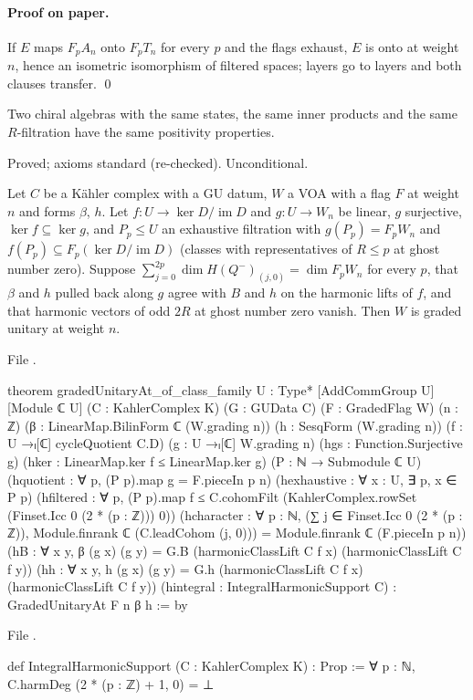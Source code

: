 \paragraph{Proof on paper.} If $E$ maps $F_pA_n$ onto $F_pT_n$ for every $p$ and the flags exhaust, $E$ is onto at weight $n$, hence an
isometric isomorphism of filtered spaces; layers go to layers and both clauses transfer. \qed

\begin{physics}
Two chiral algebras with the same states, the same inner products and the same $R$-filtration have the same positivity properties.
\end{physics}

\begin{status}
Proved; axioms standard (re-checked). Unconditional.
\end{status}

\begin{theorem}\label{l28:thm:classfamily}
Let $C$ be a Kähler complex with a GU datum, $W$ a VOA with a flag $F$ at weight $n$ and forms $\beta$, $h$. Let $f:U\to\ker D/\operatorname{im}D$
and $g:U\to W_n$ be linear, $g$ surjective, $\ker f\subseteq\ker g$, and $P_p\le U$ an exhaustive filtration with $g(P_p)=F_pW_n$ and
$f(P_p)\subseteq F_{p}(\ker D/\operatorname{im}D)$ (classes with representatives of $R\le p$ at ghost number zero). Suppose
$\sum_{j=0}^{2p}\dim H(Q^-)_{(j,0)}=\dim F_pW_n$ for every $p$, that $\beta$ and $h$ pulled back along $g$ agree with $B$ and $h$ on the harmonic
lifts of $f$, and that harmonic vectors of odd $2R$ at ghost number zero vanish. Then $W$ is graded unitary at weight $n$.
\end{theorem}

\noindent File .
\begin{leancode}
theorem gradedUnitaryAt_of_class_family {U : Type*} [AddCommGroup U] [Module ℂ U]
    (C : KahlerComplex K) (G : GUData C) (F : GradedFlag W) (n : ℤ)
    (β : LinearMap.BilinForm ℂ (W.grading n)) (h : SesqForm (W.grading n))
    (f : U →ₗ[ℂ] cycleQuotient C.D) (g : U →ₗ[ℂ] W.grading n)
    (hgs : Function.Surjective g) (hker : LinearMap.ker f ≤ LinearMap.ker g)
    (P : ℕ → Submodule ℂ U)
    (hquotient : ∀ p, (P p).map g = F.pieceIn p n)
    (hexhaustive : ∀ x : U, ∃ p, x ∈ P p)
    (hfiltered : ∀ p, (P p).map f ≤
      C.cohomFilt (KahlerComplex.rowSet (Finset.Icc 0 (2 * (p : ℤ))) 0))
    (hcharacter : ∀ p : ℕ,
      (∑ j ∈ Finset.Icc 0 (2 * (p : ℤ)), Module.finrank ℂ (C.leadCohom (j, 0))) =
        Module.finrank ℂ (F.pieceIn p n))
    (hB : ∀ x y, β (g x) (g y) = G.B (harmonicClassLift C f x) (harmonicClassLift C f y))
    (hh : ∀ x y, h (g x) (g y) = G.h (harmonicClassLift C f x) (harmonicClassLift C f y))
    (hintegral : IntegralHarmonicSupport C) : GradedUnitaryAt F n β h := by
\end{leancode}
\noindent File .
\begin{leancode}
def IntegralHarmonicSupport (C : KahlerComplex K) : Prop :=
  ∀ p : ℕ, C.harmDeg (2 * (p : ℤ) + 1, 0) = ⊥
\end{leancode}

